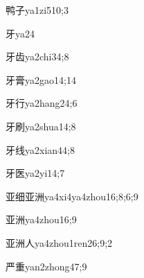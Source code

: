 \begin{verbete}{鸭子}{ya1zi5}{10;3}
\end{verbete}

\begin{verbete}{牙}{ya2}{4}
\end{verbete}

\begin{verbete}{牙齿}{ya2chi3}{4;8}
\end{verbete}

\begin{verbete}{牙膏}{ya2gao1}{4;14}
\end{verbete}

\begin{verbete}{牙行}{ya2hang2}{4;6}
\end{verbete}

\begin{verbete}{牙刷}{ya2shua1}{4;8}
\end{verbete}

\begin{verbete}{牙线}{ya2xian4}{4;8}
\end{verbete}

\begin{verbete}{牙医}{ya2yi1}{4;7}
\end{verbete}

\begin{verbete}{亚细亚洲}{ya4xi4ya4zhou1}{6;8;6;9}
\end{verbete}

\begin{verbete}{亚洲}{ya4zhou1}{6;9}
\end{verbete}

\begin{verbete}{亚洲人}{ya4zhou1ren2}{6;9;2}
\end{verbete}

\begin{verbete}{严重}{yan2zhong4}{7;9}
\end{verbete}

